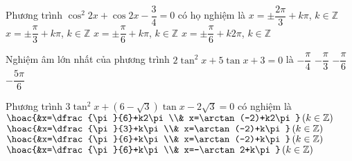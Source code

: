 \begin{ex}%
	Phương trình $\cos^2 {2x}+\cos {2x}-\dfrac{3}{4}=0$ có họ nghiệm là
	\choice
	{$x=\pm \dfrac{2\pi}{3}+k\pi$, $k\in \mathbb{Z}$}
	{$x=\pm \dfrac{\pi}{3}+k\pi$, $k\in \mathbb{Z}$}
	{\True $x=\pm \dfrac{\pi}{6}+k\pi$, $k\in \mathbb{Z}$}
	{$x=\pm \dfrac{\pi}{6}+k2\pi$, $k\in \mathbb{Z}$}
\end{ex}
\begin{ex}%
	Nghiệm âm lớn nhất của phương trình $2\tan^2x+5\tan x+3=0$ là
	\choice
	{\True $-\dfrac{\pi}{4}$}
	{$-\dfrac{\pi}{3}$}
	{$-\dfrac{\pi}{6}$}
	{$-\dfrac{5\pi}{6}$}
\end{ex}




\begin{ex}%
	Phương trình $3\tan^2x+\left(6-\sqrt{3}\right)\tan x-2\sqrt{3}=0$ có nghiệm là
	\choice
	{$\hoac{&x=\dfrac{\pi}{6}+k2\pi \\& x=\arctan (-2)+k2\pi }\left(k \in \mathbb{Z}\right)$}
	{$\hoac{&x=\dfrac{\pi}{3}+k\pi \\& x=\arctan (-2)+k\pi }\left(k \in \mathbb{Z}\right)$}
	{\True $\hoac{&x=\dfrac{\pi}{6}+k\pi \\& x=\arctan (-2)+k\pi }\left(k \in \mathbb{Z}\right)$}
	{$\hoac{&x=\dfrac{\pi}{6}+k\pi \\& x=-\arctan 2+k\pi }\left(k \in \mathbb{Z}\right)$}
\end{ex}

